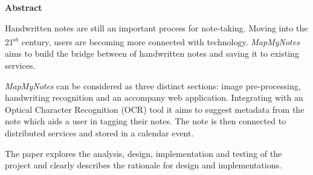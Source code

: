 \thispagestyle{empty}

\begin{center}
    {\LARGE\bf Abstract}
\end{center}


Handwritten notes are still an important process for note-taking. Moving into the 21\textsuperscript{st} century, users are becoming more connected with technology. \textit{MapMyNotes} aims to build the bridge between of handwritten notes and saving it to existing services.

\textit{MapMyNotes} can be considered as three distinct sections: image pre-processing, handwriting recognition and an accompany web application. Integrating with an Optical Character Recognition (OCR) tool it aims to suggest metadata from the note which aids a user in tagging their notes. The note is then connected to distributed services and stored in a calendar event.

The paper explores the analysis, design, implementation and testing of the project and clearly describes the rationale for design and implementations.
